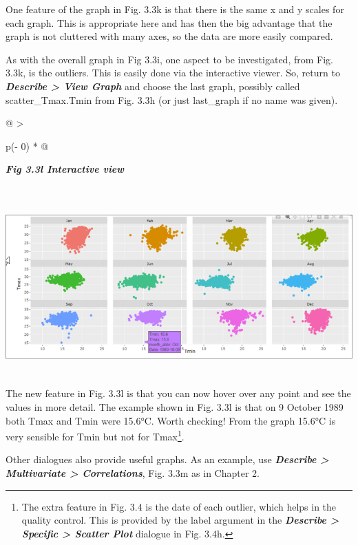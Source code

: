 \documentclass[
  letterpaper,
  DIV=11,
  numbers=noendperiod]{scrreprt}
\begin{document}
One feature of the graph in Fig. 3.3k is that there is the same x and y
scales for each graph. This is appropriate here and has then the big
advantage that the graph is not cluttered with many axes, so the data
are more easily compared.

As with the overall graph in Fig 3.3i, one aspect to be investigated,
from Fig. 3.3k, is the outliers. This is easily done via the interactive
viewer. So, return to \textbf{\emph{Describe \textgreater{} View Graph}}
and choose the last graph, possibly called scatter\_Tmax.Tmin from Fig.
3.3h (or just last\_graph if no name was given).

\begin{longtable}[]{@{}
  >{\raggedright\arraybackslash}p{(\columnwidth - 0\tabcolsep) * }@{}}
\toprule\noalign{}
\begin{minipage}[b]{\linewidth}\raggedright
\textbf{\emph{Fig 3.3l Interactive view}}
\end{minipage} \\
\midrule\noalign{}
\endhead
\bottomrule\noalign{}
\endlastfoot
\includegraphics[width=6.16175in,height=2.64806in]{figures/Fig3.3l.png} \\
\end{longtable}

The new feature in Fig. 3.3l is that you can now hover over any point
and see the values in more detail. The example shown in Fig. 3.3l is
that on 9 October 1989 both Tmax and Tmin were 15.6°C. Worth checking!
From the graph 15.6°C is very sensible for Tmin but not for
Tmax\footnote{The extra feature in Fig. 3.4 is the date of each outlier,
  which helps in the quality control. This is provided by the label
  argument in the \textbf{\emph{Describe \textgreater{} Specific
  \textgreater{} Scatter Plot}} dialogue in Fig. 3.4h.}.

Other dialogues also provide useful graphs. As an example, use
\textbf{\emph{Describe \textgreater{} Multivariate \textgreater{}
Correlations}}, Fig. 3.3m as in Chapter 2.
\end{document}
